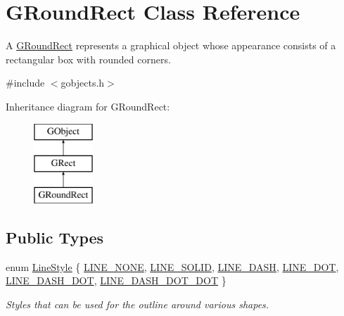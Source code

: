 \hypertarget{classsgl_1_1GRoundRect}{}\section{G\+Round\+Rect Class Reference}
\label{classsgl_1_1GRoundRect}


A \mbox{\hyperlink{classsgl_1_1GRoundRect}{G\+Round\+Rect}} represents a graphical object whose appearance consists of a rectangular box with rounded corners.  




{\ttfamily \#include $<$gobjects.\+h$>$}

Inheritance diagram for G\+Round\+Rect\+:\begin{figure}[H]
\begin{center}
\leavevmode
\includegraphics[height=3.000000cm]{classsgl_1_1GRoundRect}
\end{center}
\end{figure}
\subsection*{Public Types}
\begin{DoxyCompactItemize}
\item 
enum \mbox{\hyperlink{classsgl_1_1GObject_a86e0f5648542856159bb40775c854aa7}{Line\+Style}} \{ \mbox{\hyperlink{classsgl_1_1GObject_a86e0f5648542856159bb40775c854aa7acbc84bd5232621834ed31f44d457c1eb}{L\+I\+N\+E\+\_\+\+N\+O\+NE}}, 
\mbox{\hyperlink{classsgl_1_1GObject_a86e0f5648542856159bb40775c854aa7a700c78bc2cd76acaab26651bf7b4941f}{L\+I\+N\+E\+\_\+\+S\+O\+L\+ID}}, 
\mbox{\hyperlink{classsgl_1_1GObject_a86e0f5648542856159bb40775c854aa7a9ccba0845f785d81d07b333ae1aad84e}{L\+I\+N\+E\+\_\+\+D\+A\+SH}}, 
\mbox{\hyperlink{classsgl_1_1GObject_a86e0f5648542856159bb40775c854aa7a8e811c096cb941997f0bfda168bb6df3}{L\+I\+N\+E\+\_\+\+D\+OT}}, 
\mbox{\hyperlink{classsgl_1_1GObject_a86e0f5648542856159bb40775c854aa7ada15a2e3d737b2db7706d8300f91b89d}{L\+I\+N\+E\+\_\+\+D\+A\+S\+H\+\_\+\+D\+OT}}, 
\mbox{\hyperlink{classsgl_1_1GObject_a86e0f5648542856159bb40775c854aa7aabf4053a73eafa7ba2b7e6d664c74c1d}{L\+I\+N\+E\+\_\+\+D\+A\+S\+H\+\_\+\+D\+O\+T\+\_\+\+D\+OT}}
 \}
\begin{DoxyCompactList}\small\item\em Styles that can be used for the outline around various shapes. \end{DoxyCompactList}\end{DoxyCompactItemize}

